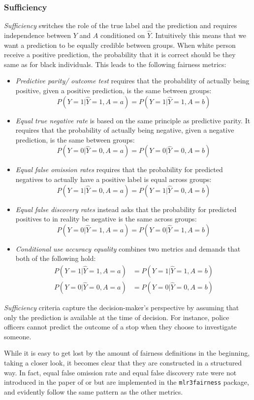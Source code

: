 \subsubsection*{Sufficiency}
\textit{Sufficiency} switches the role of the true label and the prediction and requires independence between $Y$ and $A$ conditioned on $\hat{Y}$. Intuitively this means that we want a prediction to be equally credible between groups. When white person receive a positive prediction, the probability that it is correct should be they same as for black individuals. This leads to the following fairness metrics:
\begin{itemize}
    \item \textit{Predictive parity/ outcome test} requires that the probability of actually being positive, given a positive prediction, is the same between groups:  
    $$P(Y = 1 | \hat{Y} = 1, A = a) = P(Y = 1 | \hat{Y} = 1, A = b)$$
    
    \item \textit{Equal true negative rate} is based on the same principle as predictive parity. It requires that the probability of actually being negative, given a negative prediction, is the same between groups:  
    $$P(Y = 0 | \hat{Y} = 0, A = a) = P(Y = 0 | \hat{Y} = 0, A = b)$$
    
    \item \textit{Equal false omission rates} requires that the probability for predicted negatives to actually have a positive label is equal across groups:  
    $$P(Y = 1 | \hat{Y} = 0, A = a) = P(Y = 1 | \hat{Y} = 0, A = b)$$
    
    \item \textit{Equal false discovery rates} instead asks that the probability for predicted positives to in reality be negative is the same across groups:  
    $$P(Y = 0 | \hat{Y} = 1, A = a) = P(Y = 0 | \hat{Y} = 1, A = b)$$
    
    \item \textit{Conditional use accuracy equality} combines two metrics and demands that both of the following hold:  
    \begin{align*}  
    P(Y = 1 | \hat{Y} = 1, A = a) &= P(Y = 1 | \hat{Y} = 1, A = b) \\  
    P(Y = 0 | \hat{Y} = 0, A = a) &= P(Y = 0 | \hat{Y} = 0, A = b)  
    \end{align*}
\end{itemize}


\textit{Sufficiency} criteria capture the decision-maker's perspective by assuming that only the prediction is available at the time of decision. For instance, police officers cannot predict the outcome of a stop when they choose to investigate someone.\par
While it is easy to get lost by the amount of fairness definitions in the beginning, taking a closer look, it becomes clear that they are constructed in a structured way. In fact, equal false omission rate and equal false discovery rate were not introduced in the paper of \cite{verma2018} or \cite{castelnovo2022} but are implemented in the \texttt{mlr3fairness} package, and evidently follow the same pattern as the other metrics.

